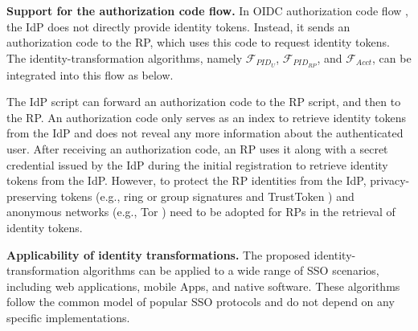 \noindent \textbf{Support for the authorization code flow.} In OIDC authorization code flow \cite{OpenIDConnect}, the IdP does not directly provide identity tokens.
Instead, it sends an authorization code to the RP, which uses this code to request identity tokens. The identity-transformation algorithms, namely $\mathcal{F}_{PID_{U}}$, $\mathcal{F}_{PID_{RP}}$, and $\mathcal{F}_{Acct}$, can be integrated into this flow as below. %

The IdP script can forward an authorization code to the RP script, and then to the RP. %
An authorization code only serves as an index to retrieve identity tokens from the IdP and does not reveal any more information about the authenticated user.
After receiving an authorization code, an RP uses it along with a secret credential issued by the IdP during the initial registration \cite{OpenIDConnect} to retrieve identity tokens from the IdP. However, to protect the RP identities from the IdP, privacy-preserving tokens (e.g., ring or group signatures \cite{ring-sig,chaum1991group} and TrustToken \cite{trusttoken}) and anonymous networks (e.g., Tor \cite{tor}) need to be adopted for RPs in the retrieval of identity tokens.



\noindent \textbf{Applicability of identity transformations.}
The proposed identity-transformation algorithms %
can be applied to a wide range of SSO scenarios, including web applications, mobile Apps, and native software.
These algorithms follow the common model of popular SSO protocols and do not depend on any specific implementations. %

